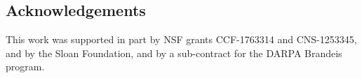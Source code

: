 \documentclass[11pt]{article}
\theoremstyle{remark}
\begin{document}
\newpage
\tableofcontents

\newpage
{}
\setcounter{page}{1}







\subsection*{Acknowledgements}
\label{sec:acknowledgements}

This work was supported in part by NSF grants CCF-1763314 and CNS-1253345, and by the Sloan Foundation, and by a sub-contract for the DARPA Brandeis program.


{\small


}


\clearpage
\appendix
{}








\end{document}
